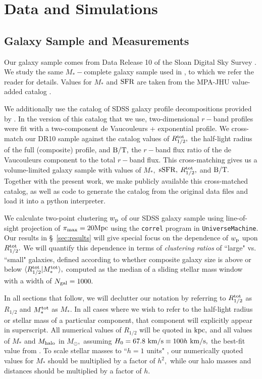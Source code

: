 \documentclass[usenatbib,usegraphicx,letterpaper]{mn2e}
\newcommand{\rhalf}{R_{1/2}}
\newcommand{\rhalftot}{R^{\rm tot}_{1/2}}
\newcommand{\bt}{{\rm B/T}}
\newcommand{\mstar}{M_{\ast}}
\newcommand{\mstartot}{M^{\rm tot}_{\ast}}
\newcommand{\ssfr}{{\rm sSFR}}
\newcommand{\sfr}{{\rm SFR}}
\newcommand{\mhalo}{M_{\rm halo}}
\newcommand{\wproj}{w_{\rm p}}
\newcommand{\kpc}{{\rm kpc}}
\newcommand{\mpc}{{\rm Mpc}}
\newcommand{\msun}{M_\odot}
\newcommand{\kms}{{\rm km/s}}
\begin{document}
\section{Data and Simulations}
\label{sec:data}

\subsection{Galaxy Sample and Measurements}
\label{subsec:galaxydata}


Our galaxy sample comes from Data Release 10 of the Sloan Digital Sky Survey \citep[SDSS][]{ahn_etal14}. We study the same $\mstar-$complete galaxy sample used in \citet{behroozi_etal15}, to which we refer the reader for details. Values for $\mstar$ and $\sfr$ are taken from the MPA-JHU value-added catalog \citep{kauffmann_etal03,brinchmann_etal04}.

We additionally use the catalog of SDSS galaxy profile decompositions provided by \citet{meert_etal15}. In the version of this catalog that we use, two-dimensional $r-$band profiles were fit with a two-component de Vaucouleurs + exponential profile. We cross-match our DR10 sample against the \citet{meert_etal15} catalog values of $\rhalftot,$ the half-light radius of the full (composite) profile, and $\bt,$ the $r-$band flux ratio of the de Vaucouleurs component to the total $r-$band flux. This cross-matching gives us a volume-limited galaxy sample with values of $\mstar,$ $\ssfr,$ $\rhalftot,$ and $\bt.$ Together with the present work, we make publicly available this cross-matched catalog, as well as code to generate the catalog from the original data files and load it into a python interpreter.

We calculate two-point clustering $\wproj$ of our SDSS galaxy sample using line-of-sight projection of $\pi_{\rm max}=20\mpc$ using the {\tt correl} program in {\tt UniverseMachine}. Our results in \S~\ref{sec:results} will give special focus on the dependence of $\wproj$ upon $\rhalftot.$ We will quantify this dependence in terms of {\em clustering ratios} of ``large" vs. ``small" galaxies, defined according to whether composite galaxy size is above or below $\langle\rhalftot\vert\mstartot\rangle,$ computed as the median of a sliding stellar mass window with a width of $N_{\rm gal}=1000.$

In all sections that follow, we will declutter our notation by referring to $\rhalftot$ as $\rhalf$ and $\mstartot$ as $\mstar.$ In all cases where we wish to refer to the half-light radius or stellar mass of a particular component, that component will explicitly appear in superscript. All numerical values of $\rhalf$ will be quoted in $\kpc,$ and all values of $\mstar$ and $\mhalo$ in $\msun,$ assuming $H_0=67.8~\kms\equiv100h~\kms,$ the best-fit value from \citet{planck15}. To scale stellar masses to ``$h=1$ units" \citep{croton13}, our numerically quoted values for $\mstar$ should be multiplied by a factor of $h^2,$ while our halo masses and distances should be multiplied by a factor of $h.$
\end{document}
